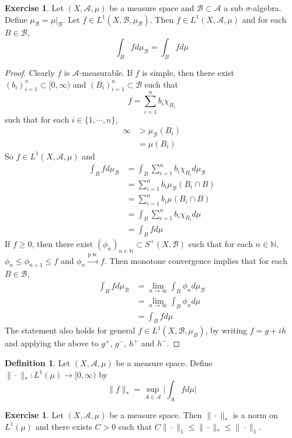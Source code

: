 \documentclass[12pt]{amsart}
\theoremstyle{definition}
\newtheorem{defn}[definition]{Definition}
\newtheorem{ex}[definition]{Exercise}
\newcommand{\sig}{\sigma}
\newcommand{\N}{\mathbb{N}}
\newcommand{\MA}{\mathcal{A}}
\newcommand{\MB}{\mathcal{B}}
\newcommand{\Rg}{[0,\infty)}
\newcommand{\limn}{\lim \limits_{n \rightarrow \infty}}
\newcommand{\convt}[1]{\xrightarrow{\text{#1}}}
\newcommand{\lex}[1]{\label{ex:#1}}
\begin{document}
	\begin{ex} \lex{00000} 
	Let $(X, \MA, \mu)$ be a measure space and $\MB \subset \MA$ a sub $\sig$-algebra. Define $\mu_{\MB} = \mu|_{\MB}$. Let $f \in L^1(X, \MB, \mu_{\MB})$. Then $f \in L^1(X, \MA, \mu)$ and for each $B \in \MB$, $$\int_B f d \mu_{\MB} = \int_B f d \mu$$
	\end{ex}
	
	\begin{proof}
	Clearly $f$ is $\MA$-measurable. If $f$ is simple, then there exist $(b_i)_{i=1}^n \subset \Rg$ and $(B_i)_{i=1}^n \subset \MB$ such that $$f = \sum_{i=1}^n b_i \chi_{B_i}$$ such that for each $i \in \{1, \cdots, n\}$, 
	\begin{align*}
	\infty 
	&> \mu_{\MB}(B_i) \\
	&= \mu(B_i)
	\end{align*}
	So $f \in L^1(X, \MA, \mu)$ and 
	\begin{align*}
	\int_B f d \mu_{\MB} 
	&= \int_B \sum_{i=1}^n b_i \chi_{B_i} d\mu_{\MB} \\
	&= \sum_{i=1}^n b_i \mu_{\MB}(B_i \cap B)\\
	&= \sum_{i=1}^n b_i \mu(B_i \cap B)\\
	&= \int_B \sum_{i=1}^n b_i\chi_{B_i} d \mu \\
	&= \int_B f d \mu
	\end{align*}
	If $f \geq 0$, then there exist $(\phi_n)_{n \in \N} \subset S^+(X, \MB)$ such that for each $n \in \N$, $\phi_n \leq \phi_{n+1} \leq f$ and $\phi_n \convt{p.w.} f$. Then monotone convergence implies that for each $B \in \MB$,
	\begin{align*}
	\int_B f d\mu_{\MB} 
	&= \limn \int_B \phi_n d\mu_{\MB} \\
	&= \limn \int_B \phi_n d \mu \\
	&= \int_B f d\mu
	\end{align*}
	The statement also holds for general $f \in L^1(X, \MB, \mu_B)$, by writing $f = g+ih$ and applying the above to $g^+$, $g^-$, $h^+$ and $h^-$.
	\end{proof}
	
	\begin{defn}
	Let $(X, \MA, \mu)$ be a measure space. Define $\| \cdot \|_*: L^1(\mu) \rightarrow \Rg$ by  
	 $$\| f \|_* = \sup_{A \in \MA} \bigg | \int_A f d\mu \bigg |$$ 
	\end{defn}
	
	\begin{ex}
	Let $(X, \MA, \mu)$ be a measure space. Then $\| \cdot \|_*$ is a norm on $L^1(\mu)$ and there exists $C >0$ such that $C\|\cdot\|_1 \leq \|\cdot\|_* \leq \| \cdot \|_1$.
	\end{ex}
	
\end{document}
